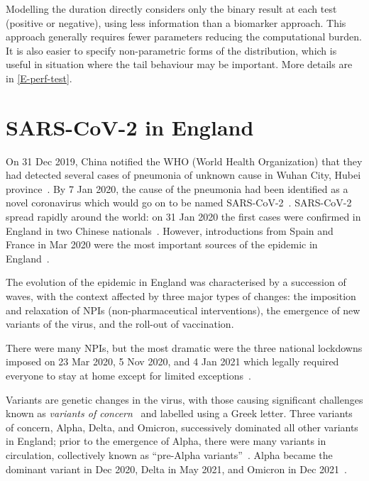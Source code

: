 \documentclass[thesis.tex]{subfiles}
\begin{document}
Modelling the duration directly considers only the binary result at each test (positive or negative), using less information than a biomarker approach.
This approach generally requires fewer parameters reducing the computational burden.
It is also easier to specify non-parametric forms of the distribution, which is useful in situation where the tail behaviour may be important.
More details are in \cref{E-perf-test}.


\section{SARS-CoV-2 in England}

On 31 Dec 2019, China notified the WHO (World Health Organization) that they had detected several cases of pneumonia of unknown cause in Wuhan City, Hubei province~\autocite{whoNovelPneumonia2020}.
By 7 Jan 2020, the cause of the pneumonia had been identified as a novel coronavirus which would go on to be named SARS-CoV-2~\autocite{whoNovelCov2020}.
SARS-CoV-2 spread rapidly around the world: on 31 Jan 2020 the first cases were confirmed in England in two Chinese nationals~\autocite{bbcFirstUKCOVID}.
However, introductions from Spain and France in Mar 2020 were the most important sources of the epidemic in England~\autocite{duplessisEstablishment}.

The evolution of the epidemic in England was characterised by a succession of waves, with the context affected by three major types of changes: the imposition and relaxation of NPIs (non-pharmaceutical interventions), the emergence of new variants of the virus, and the roll-out of vaccination.

There were many NPIs, but the most dramatic were the three national lockdowns imposed on 23 Mar 2020, 5 Nov 2020, and 4 Jan 2021 which legally required everyone to stay at home except for limited exceptions~\autocite{ifgTimeline}.

Variants are genetic changes in the virus, with those causing significant challenges known as \emph{variants of concern}~\autocite{whoVOC} and labelled using a Greek letter.
Three variants of concern, Alpha, Delta, and Omicron, successively dominated all other variants in England; prior to the emergence of Alpha, there were many variants in circulation, collectively known as ``pre-Alpha variants''~\autocite{lythgoeLineage}.
Alpha became the dominant variant in Dec 2020, Delta in May 2021, and Omicron in Dec 2021~\autocite{lythgoeLineage}.
\end{document}
